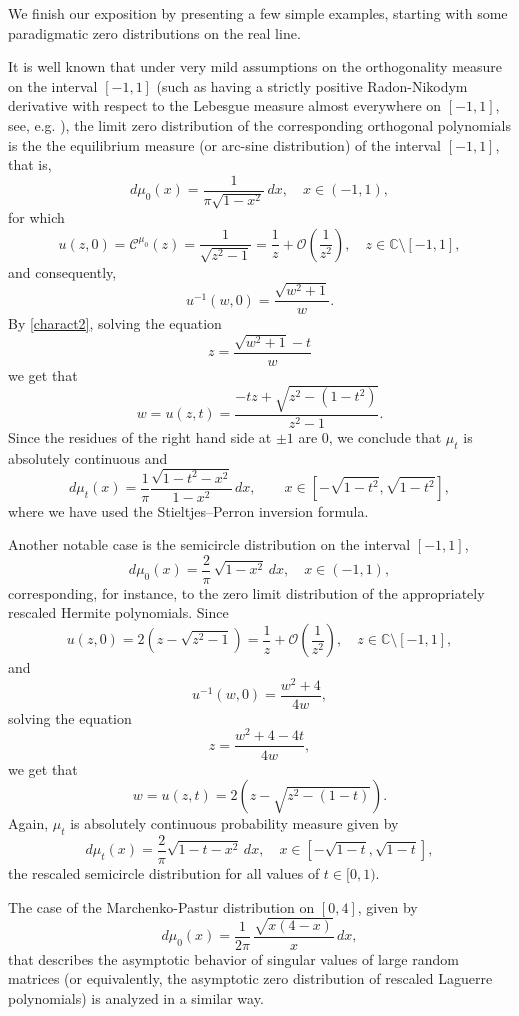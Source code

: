 \documentclass[reqno,11pt]{amsart}
\theoremstyle{plain}
\theoremstyle{definition}
\theoremstyle{remark}
\numberwithin{equation}{section}
\numberwithin{equation}{section}
\newcommand{\C}{\mathbb{C}}
\begin{document}
We finish our exposition by presenting a few simple examples, starting with some paradigmatic zero distributions on the real line. 

It is well known that under very mild assumptions on the orthogonality measure on the interval $[-1,1]$ (such as having a strictly positive Radon-Nikodym derivative with respect to the Lebesgue measure almost everywhere on $[-1,1]$, see, e.g. \cite{StTo}), the limit zero distribution of the corresponding orthogonal polynomials is the the equilibrium measure (or arc-sine distribution) of the interval $[-1,1]$, that is,
$$
d\mu_0(x)=\frac{1}{\pi \sqrt{1-x^2}}\, dx, \quad x\in (-1,1),
$$
for which 
$$
u(z,0)=\mathcal C^{\mu_0}(z)=\frac{1}{\sqrt{z^2-1}} =\frac{1}{z} + \mathcal O\left(\frac{1}{z^2} \right), \quad z\in \C\setminus [-1,1],
$$
and consequently,
$$
u^{-1} (w, 0)=\frac{\sqrt{w^2+1}}{w}.
$$
By \eqref{charact2}, solving the equation
$$
z= \frac{\sqrt{w^2+1}-t}{w}
$$
we get that
$$
w=u(z,t) = \frac{-tz + \sqrt{z^2-(1-t^2)}}{z^2-1} . 
$$
Since the residues of the right hand side at $\pm 1$ are $0$, we conclude that $\mu_t$ is absolutely continuous and
	\begin{equation}\label{eqArcsine}
d\mu_t(x) = \frac{1}{\pi} \frac{\sqrt{1-t^2-x^2}}{1-x^2}\, dx, \qquad x\in [-\sqrt{1-t^2}, \sqrt{1-t^2}],
	\end{equation}
where we have used the Stieltjes--Perron inversion formula. 

\medskip

Another notable case is the semicircle distribution on the interval $[-1,1]$,
	$$
	d\mu_0(x)=\frac{2}{\pi }\, \sqrt{1-x^2}\, dx, \quad x\in (-1,1), 
	$$
corresponding, for instance, to the zero limit distribution of the appropriately rescaled Hermite polynomials. Since
	$$
	u(z,0)=2 \left( z-\sqrt{z^2-1}\right)  =\frac{1}{z} + \mathcal O\left(\frac{1}{z^2} \right), \quad z\in \C\setminus [-1,1],
	$$
	and
	$$
	u^{-1} (w, 0)=\frac{ w^2+4}{4w},
	$$
solving the equation
	$$
	z= \frac{ w^2+4-4t}{4w},
	$$
	we get that
	$$
w=	u(z,t) = 2 \left( z-\sqrt{z^2-(1-t)}\right) .
	$$
	Again, $\mu_t$ is absolutely continuous probability measure  given by
	\begin{equation}\label{eqSemicircle}
		d\mu_t(x) = \frac{2}{\pi }  \sqrt{1-t-x^2} \, dx, \quad x\in [-\sqrt{1-t}, \sqrt{1-t}],
	\end{equation}
the rescaled semicircle distribution for all values of $t\in [0,1)$.


\medskip


The case of the Marchenko-Pastur distribution on $[0,4]$, given by
$$
d\mu_0(x)=\frac{1}{2\pi} \, \frac{\sqrt{x(4-x)}}{x}\, dx,
$$
that describes the asymptotic behavior of singular values of large random matrices (or equivalently, the asymptotic zero distribution of rescaled Laguerre polynomials) is analyzed in a similar way.
\end{document}
